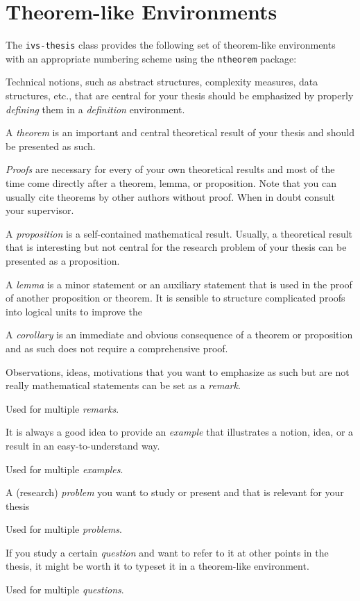 \section{Theorem-like Environments} \label{sec:theorem-like-environments} 

The \texttt{ivs-thesis} class provides the following set of theorem-like environments with an appropriate numbering scheme using the \texttt{ntheorem} package: 
\begin{description}[font=\normalfont\ttfamily]
	\item[defn] Technical notions, such as abstract structures, complexity measures, data structures, etc., that are central for your thesis should be emphasized by properly \emph{defining} them in a \emph{definition} environment. 
	\item[thm] A \emph{theorem} is an important and central theoretical result of your thesis and should be presented as such. 
	\item[proof] \emph{Proofs} are necessary for every of your own theoretical results and most of the time come directly after a theorem, lemma, or proposition. Note that you can usually cite theorems by other authors without proof. When in doubt consult your supervisor. 
	\item[prop] A \emph{proposition} is a self-contained mathematical result. Usually, a theoretical result that is interesting but not central for the research problem of your thesis can be presented as a proposition. 
	\item[lem] A \emph{lemma} is a minor statement or an auxiliary statement that is used in the proof of another proposition or theorem. It is sensible to structure complicated proofs into logical units to improve the 
	\item[cor] A \emph{corollary} is an immediate and obvious consequence of a theorem or proposition and as such does not require a comprehensive proof. 
	\item[rmk] Observations, ideas, motivations that you want to emphasize as such but are not really mathematical statements can be set as a \emph{remark}. 
	\item[rmks] Used for multiple \emph{remarks}. 
	\item[exa] It is always a good idea to provide an \emph{example} that illustrates a notion, idea, or a result in an easy-to-understand way. 
	\item[exas] Used for multiple \emph{examples}. 
	\item[prblm] A (research) \emph{problem} you want to study or present and that is relevant for your thesis
	\item[prblms] Used for multiple \emph{problems}. 
	\item[quest] If you study a certain \emph{question} and want to refer to it at other points in the thesis, it might be worth it to typeset it in a theorem-like environment. 
	\item[quests] Used for multiple \emph{questions}. 
\end{description}

